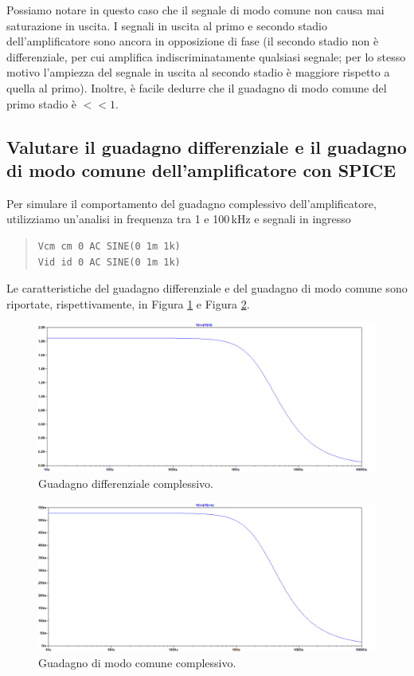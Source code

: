 \documentclass[a4paper,10pt]{article}
\begin{document}
Possiamo notare in questo caso che il segnale di modo comune non causa mai saturazione in uscita. I segnali in uscita al primo e secondo stadio dell'amplificatore sono ancora in opposizione di fase (il secondo stadio non è differenziale, per cui amplifica indiscriminatamente qualsiasi segnale; per lo stesso motivo l'ampiezza del segnale in uscita al secondo stadio è maggiore rispetto a quella al primo). Inoltre, è facile dedurre che il guadagno di modo comune del primo stadio è $<<1$.

\newpage
\subsection{Valutare il guadagno differenziale e il guadagno di modo comune dell'amplificatore con SPICE}
Per simulare il comportamento del guadagno complessivo dell'amplificatore, utilizziamo un'analisi in frequenza tra 1 e 100$\,$kHz e segnali in ingresso
\begin{quote}
\begin{verbatim}
Vcm cm 0 AC SINE(0 1m 1k)
Vid id 0 AC SINE(0 1m 1k)
\end{verbatim}
\end{quote}
Le caratteristiche del guadagno differenziale e del guadagno di modo comune sono riportate, rispettivamente, in Figura \ref{fig:gainid} e Figura \ref{fig:gaincm}.\\

\begin{figure}[h!]
  	\centering
 	\includegraphics[width=0.9\linewidth]{es1-7-id.png}
  	\caption{Guadagno differenziale complessivo.}
  	\label{fig:gainid}
\end{figure}
\begin{figure}[h!]
  	\centering
 	\includegraphics[width=0.9\linewidth]{es1-7-vcm.png}
  	\caption{Guadagno di modo comune complessivo.}
  	\label{fig:gaincm}
\end{figure}
\end{document}

